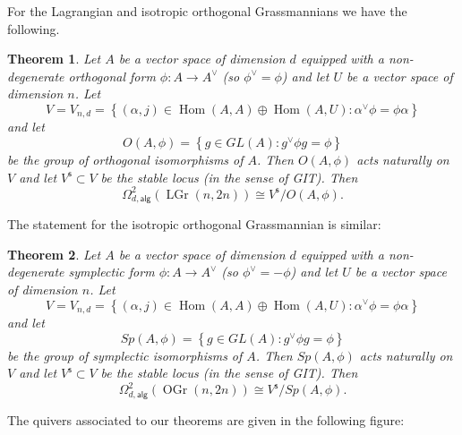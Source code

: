 \documentclass{amsart}
\newtheorem{theorem}{Theorem}[section]
\theoremstyle{definition}
\newcommand{\Hom}{\operatorname{Hom}}
\newcommand{\alg}{\mathsf{alg}}
\newcommand{\stable}{\mathsf{s}}
\newcommand{\LGr}{\operatorname{LGr}}
\newcommand{\OGr}{\operatorname{OGr}}
\newcommand{\LoopTwo}{\Omega^{2}_{d,\alg}}
\begin{document}
For the Lagrangian and isotropic orthogonal Grassmannians we have the following.

\begin{theorem}\label{thm: quiver description of Loop2Alg(LGr)}
Let $A$ be a vector space of dimension $d$ equipped with a
non-degenerate orthogonal form $\phi :A\to A^{\vee}$ (so
$\phi^{\vee}=\phi$) and let $U$ be a vector space of dimension
$n$. Let
\[
V=V_{n,d}=\left\{(\alpha ,j)\in \Hom (A,A)\oplus \Hom (A,U):
\alpha^{\vee}\phi =\phi \alpha \right\} 
\]
and let 
\[
O(A,\phi ) = \left\{g\in GL(A):g^{\vee}\phi g=\phi  \right\}
\]
be the group of orthogonal isomorphisms of $A$. Then $O(A,\phi )$ acts
naturally on $V$ and let $V^{\stable}\subset V$ be the stable
locus (in the sense of GIT). Then
\[
\LoopTwo (\LGr(n,2n))\cong V^{\stable}/O(A,\phi ). 
\]
\end{theorem}

The statement for the isotropic orthogonal Grassmannian is similar:


\begin{theorem}\label{thm: quiver description of Loop2Alg(OGr)}
Let $A$ be a vector space of dimension $d$ equipped with a
non-degenerate symplectic form $\phi :A\to A^{\vee}$ (so
$\phi^{\vee}=-\phi$) and let $U$ be a vector space of dimension
$n$. Let
\[
V=V_{n,d}=\left\{(\alpha ,j)\in \Hom (A,A)\oplus \Hom (A,U):
\alpha^{\vee}\phi =\phi \alpha \right\} 
\]
and let 
\[
Sp(A,\phi ) = \left\{g\in GL(A):g^{\vee}\phi g=\phi  \right\}
\]
be the group of symplectic isomorphisms of $A$. Then $Sp(A,\phi )$ acts
naturally on $V$ and let $V^{\stable}\subset V$ be the stable
locus (in the sense of GIT). Then
\[
\LoopTwo (\OGr(n,2n))\cong V^{\stable}/Sp(A,\phi ). 
\]
\end{theorem}

The quivers associated to our theorems are given in the following figure:
\end{document}
